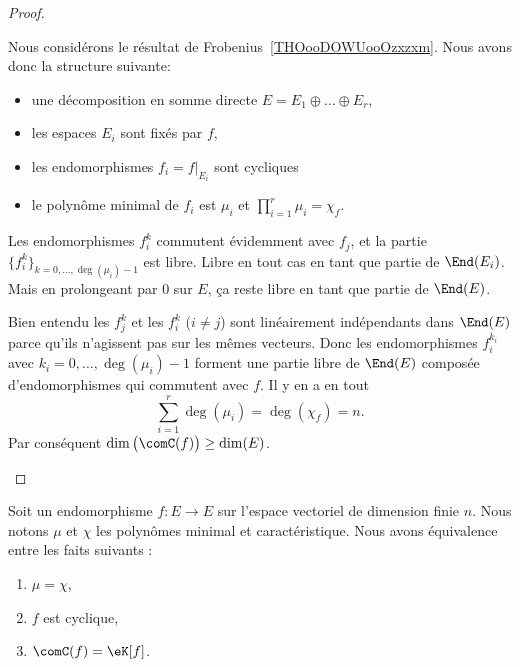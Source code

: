 \begin{proof}
\begin{subproof}
            Nous considérons le résultat de Frobenius~\ref{THOooDOWUooOzxzxm}. Nous avons donc la structure suivante:
            \begin{itemize}
                \item
            une décomposition en somme directe \( E=E_1\oplus\ldots\oplus E_r\),
        \item
            les espaces \( E_i\) sont fixés par \( f\),
        \item
            les endomorphismes \( f_i=f|_{E_i}\) sont cycliques
        \item
            le polynôme minimal de \( f_i\) est \( \mu_i\) et \( \prod_{i=1}^r\mu_i=\chi_f\).
            \end{itemize}
            Les endomorphismes \( f_i^k\) commutent évidemment avec \( f_j\), et la partie \( \{ f_i^k \}_{k=0,\ldots, \deg(\mu_i)-1}\) est libre. Libre en tout cas en tant que partie de \( \End(E_i)\). Mais en prolongeant par \( 0\) sur \( E\), ça reste libre en tant que partie de \( \End(E)\).

            Bien entendu les \( f_j^k\) et les \( f_i^k\) (\( i\neq j\)) sont linéairement indépendants dans \( \End(E)\) parce qu'ils n'agissent pas sur les mêmes vecteurs. Donc les endomorphismes \( f_i^{k_i}\) avec \( k_i=0,\ldots, \deg(\mu_i)-1\) forment une partie libre de \( \End(E)\) composée d'endomorphismes qui commutent avec \( f\). Il y en a en tout
            \begin{equation}
                \sum_{i=1}^r\deg(\mu_i)=\deg(\chi_f)=n.
            \end{equation}
            Par conséquent \( \dim\big( \comC(f) \big)\geq \dim(E)\).
    \end{subproof}
\end{proof}

\begin{theorem}      \label{THOooGLMSooYewNxW}
    Soit un endomorphisme \( f\colon E\to E\) sur l'espace vectoriel de dimension finie \( n\). Nous notons \( \mu\) et \( \chi\) les polynômes minimal et caractéristique. Nous avons équivalence entre les faits suivants :
    \begin{enumerate}
        \item   \label{ITEMooLRXIooLWaYqJii}
            \( \mu=\chi\),
        \item   \label{ITEMooLRXIooLWaYqJi}
            \( f\) est cyclique,
        \item   \label{ITEMooLRXIooLWaYqJiii}
            \( \comC(f)=\eK[f]\).
    \end{enumerate}
\end{theorem}

